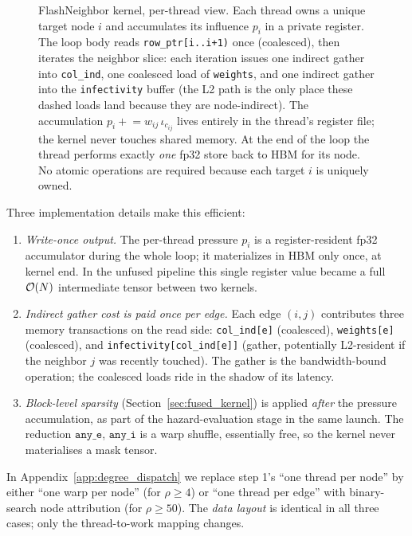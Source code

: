 \begin{figure}[H]
\centering

\caption{FlashNeighbor kernel, per-thread view. Each thread owns a unique target node $i$ and accumulates its influence $p_i$ in a private register. The loop body reads \texttt{row\_ptr[i..i+1)} once (coalesced), then iterates the neighbor slice: each iteration issues one indirect gather into \texttt{col\_ind}, one coalesced load of \texttt{weights}, and one indirect gather into the \texttt{infectivity} buffer (the L2 path is the only place these dashed loads land because they are node-indirect). The accumulation $p_i \mathrel{+}= w_{ij}\,\iota_{c_{ij}}$ lives entirely in the thread's register file; the kernel never touches shared memory. At the end of the loop the thread performs exactly \emph{one} fp32 store back to HBM for its node. No atomic operations are required because each target $i$ is uniquely owned.}
\label{fig:flashneighbor}
\end{figure}

Three implementation details make this efficient:
\begin{enumerate}
\item \emph{Write-once output.} The per-thread pressure $p_i$ is a register-resident fp32 accumulator during the whole loop; it materializes in HBM only once, at kernel end. In the unfused pipeline this single register value became a full $\mathcal{O}(N)$ intermediate tensor between two kernels.
\item \emph{Indirect gather cost is paid once per edge.} Each edge $(i,j)$ contributes three memory transactions on the read side: \texttt{col\_ind[e]} (coalesced), \texttt{weights[e]} (coalesced), and \texttt{infectivity[col\_ind[e]]} (gather, potentially L2-resident if the neighbor $j$ was recently touched). The gather is the bandwidth-bound operation; the coalesced loads ride in the shadow of its latency.
\item \emph{Block-level sparsity} (Section~\ref{sec:fused_kernel}) is applied \emph{after} the pressure accumulation, as part of the hazard-evaluation stage in the same launch. The reduction $\texttt{any\_e}$, $\texttt{any\_i}$ is a warp shuffle, essentially free, so the kernel never materialises a mask tensor.
\end{enumerate}

In Appendix~\ref{app:degree_dispatch} we replace step 1's ``one thread per node'' by either ``one warp per node'' (for $\rho \geq 4$) or ``one thread per edge'' with binary-search node attribution (for $\rho \geq 50$). The \emph{data layout} is identical in all three cases; only the thread-to-work mapping changes.

